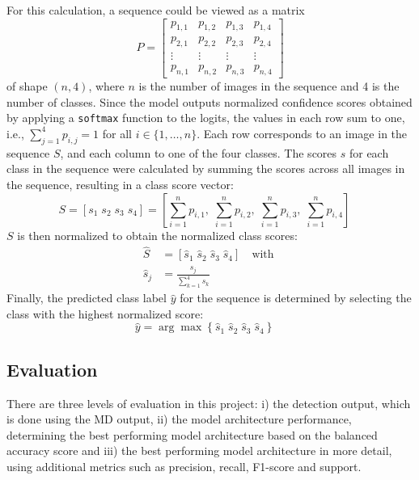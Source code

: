     For this calculation, a sequence could be viewed as a matrix
    \begin{equation}
        P = 
        \begin{bmatrix}
        p_{1,1} & p_{1,2} & p_{1,3} & p_{1,4} \\
        p_{2,1} & p_{2,2} & p_{2,3} & p_{2,4} \\
        \vdots  & \vdots  & \vdots  & \vdots  \\
        p_{n,1} & p_{n,2} & p_{n,3} & p_{n,4}
        \end{bmatrix}
    \label{eq:sequence_matrix}
    \end{equation}
    of shape \((n, 4)\), where \(n\) is the number of images in the sequence and 4 is the number of classes.
    Since the model outputs normalized confidence scores obtained by applying a \texttt{softmax} function to the logits, the values in each row sum to one, i.e., \( \sum_{j=1}^{4} p_{i,j} = 1 \) for all \( i \in \{1, \ldots, n\} \).
    Each row corresponds to an image in the sequence \(S\), and each column to one of the four classes.
    The scores \(s\) for each class in the sequence were calculated by summing the scores across all images in the sequence, resulting in a class score vector:
    \begin{equation}
        S = [s_1\; s_2\; s_3\; s_4] = \left[ \sum_{i=1}^n p_{i,1},\; \sum_{i=1}^n p_{i,2},\; \sum_{i=1}^n p_{i,3},\; \sum_{i=1}^n p_{i,4} \right]\quad
    \label{eq:class_score_vector}
    \end{equation}
    \( S \) is then normalized to obtain the normalized class scores:
    \begin{equation}
    \begin{aligned}
        \hat{S} &= [\hat{s}_1\; \hat{s}_2\; \hat{s}_3\; \hat{s}_4]\quad \text{with } \\
        \hat{s}_j &= \frac{s_j}{\sum_{k=1}^4  s_k}\quad
    \end{aligned}
    \label{eq:normalized_class_scores}
    \end{equation}
    Finally, the predicted class label \( \hat{y} \) for the sequence is determined by selecting the class with the highest normalized score:
    \begin{equation}
        \hat{y} = \arg\max \left\{\hat{s}_1\; \hat{s}_2\; \hat{s}_3\; \hat{s}_4\right\}\quad
    \label{eq:predicted_sequence_label}
    \end{equation}

    \subsection{Evaluation}
    There are three levels of evaluation in this project:
    i) the detection output, which is done using the \ac{MD} output,
    ii) the model architecture performance, determining the best performing model architecture based on the balanced accuracy score and
    iii) the best performing model architecture in more detail, using additional metrics such as precision, recall, F1-score and support.

